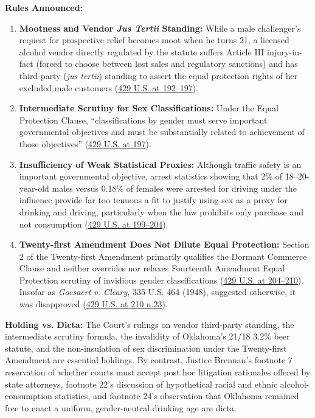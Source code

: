 \documentclass[12pt]{article}
\begin{document}
\textbf{Rules Announced:}
\begin{enumerate}
  \item \textbf{Mootness and Vendor \textit{Jus Tertii} Standing:} While a male challenger's request for prospective relief becomes moot when he turns 21, a licensed alcohol vendor directly regulated by the statute suffers Article III injury-in-fact (forced to choose between lost sales and regulatory sanctions) and has third-party (\textit{jus tertii}) standing to assert the equal protection rights of her excluded male customers (\href{https://supreme.justia.com/cases/federal/us/429/190/}{429 U.S. at 192--197}).
  \item \textbf{Intermediate Scrutiny for Sex Classifications:} Under the Equal Protection Clause, ``classifications by gender must serve important governmental objectives and must be substantially related to achievement of those objectives'' (\href{https://supreme.justia.com/cases/federal/us/429/190/}{429 U.S. at 197}).
  \item \textbf{Insufficiency of Weak Statistical Proxies:} Although traffic safety is an important governmental objective, arrest statistics showing that 2\% of 18--20-year-old males versus 0.18\% of females were arrested for driving under the influence provide far too tenuous a fit to justify using sex as a proxy for drinking and driving, particularly when the law prohibits only purchase and not consumption (\href{https://supreme.justia.com/cases/federal/us/429/190/}{429 U.S. at 199--204}).
  \item \textbf{Twenty-first Amendment Does Not Dilute Equal Protection:} Section 2 of the Twenty-first Amendment primarily qualifies the Dormant Commerce Clause and neither overrides nor relaxes Fourteenth Amendment Equal Protection scrutiny of invidious gender classifications (\href{https://supreme.justia.com/cases/federal/us/429/190/}{429 U.S. at 204--210}). Insofar as \textit{Goesaert v. Cleary}, 335 U.S. 464 (1948), suggested otherwise, it was disapproved (\href{https://supreme.justia.com/cases/federal/us/429/190/}{429 U.S. at 210 n.23}).
\end{enumerate}

\textbf{Holding vs. Dicta:} The Court's rulings on vendor third-party standing, the intermediate scrutiny formula, the invalidity of Oklahoma's 21/18 3.2\% beer statute, and the non-insulation of sex discrimination under the Twenty-first Amendment are essential holdings. By contrast, Justice Brennan's footnote 7 reservation of whether courts must accept post hoc litigation rationales offered by state attorneys, footnote 22's discussion of hypothetical racial and ethnic alcohol-consumption statistics, and footnote 24's observation that Oklahoma remained free to enact a uniform, gender-neutral drinking age are dicta.
\end{document}
